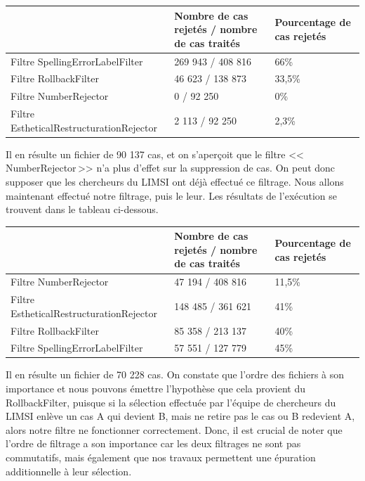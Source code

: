 \documentclass[11pt]{article}
\begin{document}
\begin{center}
\begin{tabular}{|M{6cm}|M{5cm}|M{6cm}|}
   \hline
    \, &Nombre de cas rejet\'{e}s / nombre de cas trait\'{e}s & Pourcentage de cas rejet\'{e}s \tabularnewline
    \hline
    Filtre SpellingErrorLabelFilter & 269 943 / 408 816 & 66\% \tabularnewline
   \hline
       Filtre RollbackFilter & 46 623 / 138 873 & 33,5\% \tabularnewline
 \hline
    Filtre NumberRejector & 0 / 92 250 & 0\% \tabularnewline
\hline
Filtre EstheticalRestructurationRejector & 2 113 / 92 250 & 2,3\% \tabularnewline
\hline
\end{tabular}
\end{center}

Il en r\'{e}sulte un fichier de 90 137 cas, et on s'aper\c{c}oit que le filtre <<\,NumberRejector\,>> n'a plus d'effet sur la suppression de cas. On peut donc supposer que les chercheurs du LIMSI ont d\'{e}j\`{a} effectu\'{e} ce filtrage.
\newline
\newline
Nous allons maintenant effectu\'{e} notre filtrage, puis le leur.
Les r\'{e}sultats de l'ex\'{e}cution se trouvent dans le tableau ci-dessous.

\begin{center}
\begin{tabular}{|M{6cm}|M{5cm}|M{6cm}|}
   \hline
    \, &Nombre de cas rejet\'{e}s / nombre de cas trait\'{e}s & Pourcentage de cas rejet\'{e}s \tabularnewline
    \hline
     Filtre NumberRejector & 47 194 / 408 816 & 11,5\% \tabularnewline
\hline
Filtre EstheticalRestructurationRejector & 148 485 / 361 621 & 41\% \tabularnewline
\hline
Filtre RollbackFilter & 85 358 / 213 137 & 40\% \tabularnewline
 \hline
    Filtre SpellingErrorLabelFilter & 57 551 / 127 779 & 45\% \tabularnewline
   \hline
   \end{tabular}
\end{center}
Il en r\'{e}sulte un fichier de 70 228 cas.
\newline
On constate que l'ordre des fichiers \`{a} son importance et nous pouvons \'{e}mettre l'hypoth\`{e}se que cela provient du RollbackFilter, puisque si la s\'{e}lection effectu\'{e}e par l'\'{e}quipe de chercheurs du LIMSI enl\`{e}ve un cas A qui devient B, mais ne retire pas le cas ou B redevient A, alors notre filtre ne fonctionner correctement.
Donc, il est crucial de noter que l'ordre de filtrage a son importance car les deux filtrages ne sont pas commutatifs, mais \'{e}galement que nos travaux permettent une \'{e}puration additionnelle \`{a} leur s\'{e}lection.
\end{document}
